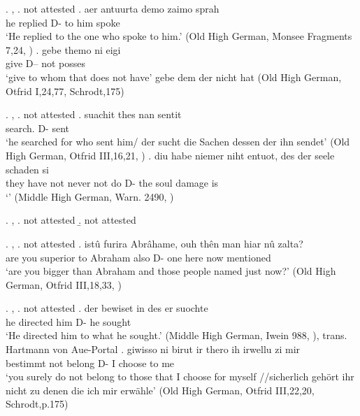 \ex. , 
\a.  not attested
\bg. aer antuurta demo zaimo sprah\\
he replied\scsub{[dat]} D- {to him} spoke\scsub{[nom]}\\
`He replied to the one who spoke to him.' \hfill (Old High German, Monsee Fragments 7,24, \citealt[761]{behaghel1923})
\bg. gebe themo ni eigi\\
 give\scsub{[dat]} D-- not posses\scsub{[nom]}\\
 `give to whom that does not have' gebe dem der nicht hat \hfill (Old High German, Otfrid I,24,77, Schrodt,175)

\ex. , 
\a.  not attested
\bg. suachit thes nan sentit\\
 search. D-  sent\\
 `he searched for who sent him/ der sucht die Sachen dessen der ihn sendet' \hfill (Old High German, Otfrid III,16,21, \citealt[761]{behaghel1923})
\bg. diu habe niemer niht entuot, des der seele schaden si\\
 they have not never {not do} D- the soul damage is\scsub{[nom]}\\
 `' \hfill (Middle High German, Warn. 2490, \citealt[761]{behaghel1923})

\ex. , 
\a.  not attested
\b.  not attested

\ex. , 
\a.  not attested
\bg. istû furira Abrâhame, ouh thên man hiar nû zalta?\\
 {are you} {superior to}\scsub{[dat]} Abraham also D- one here now mentioned\scsub{[acc]}\\
 `are you bigger than Abraham and those people named just now?' \hfill (Old High German, Otfrid III,18,33, \citealt[761]{behaghel1923})

\ex. , 
\a.  not attested
\bg. der bewiset in des er suochte\\
 he directed\scsub{[gen]} him D- he sought\scsub{[acc]}\\
 `He directed him to what he sought.' \hfill (Middle High German, Iwein 988, \citealt[761]{behaghel1923}), trans. Hartmann von Aue-Portal
\bg. giwisso ni birut ir thero ih irwellu zi mir\\
 bestimmt not belong\scsub{[gen]}  D- I choose\scsub{[acc]} to me\\
 `you surely do not belong to those that I choose for myself //sicherlich gehört ihr nicht zu denen die ich mir erwähle' \hfill (Old High German, Otfrid III,22,20, Schrodt,p.175)

